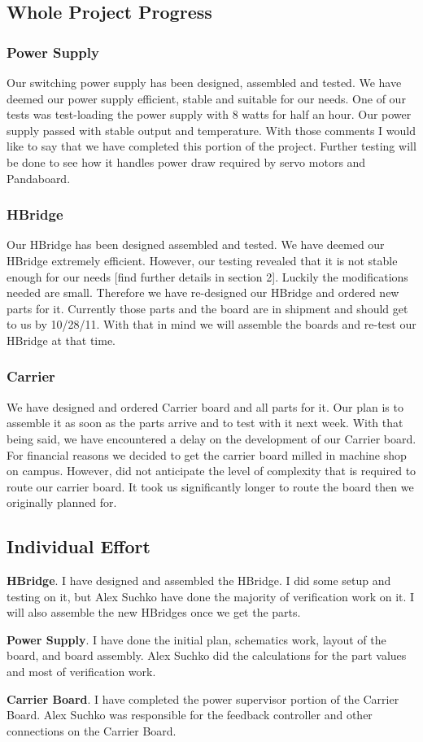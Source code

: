 \documentclass[12pt]{article}
\begin{document}
\subsection{Whole Project Progress}
\subsubsection{Power Supply}
Our switching power supply has been designed, assembled and tested. We have deemed our power supply efficient, stable and suitable for our needs. One of our tests was test-loading the power supply with 8 watts for half an hour. Our power supply passed with stable output and temperature. With those comments I would like to say that we have completed this portion of the project. Further testing will be done to see how it handles power draw required by servo motors and Pandaboard.
\subsubsection{HBridge}
Our HBridge has been designed assembled and tested. We have deemed our HBridge extremely efficient. However, our testing revealed that it is not stable enough for our needs [find further details in section 2]. Luckily the modifications needed are small. Therefore we have re-designed our HBridge and ordered new parts for it. Currently those parts and the board are in shipment and should get to us by 10/28/11. With that in mind we will assemble the boards and re-test our HBridge at that time. 
\subsubsection{Carrier}
We have designed and ordered Carrier board and all parts for it. Our plan is to assemble it as soon as the parts arrive and to test with it next week. With that being said, we have encountered a delay on the development of our Carrier board. For financial reasons we decided to get the carrier board milled in machine shop on campus. However, did not anticipate the level of complexity that is required to route our carrier board. It took us significantly longer to route the board then we originally planned for.
\subsection{Individual Effort}
 \begin{description}
  \item{\bf HBridge}. I have designed and assembled the HBridge. I did some setup and testing on it, but Alex Suchko have done the majority of verification work on it. I will also assemble the new HBridges once we get the parts. 
  \item{\bf Power Supply}. I  have done the initial plan, schematics work, layout of the board, and board assembly. Alex Suchko did the calculations for the part values and most of verification work. 
  \item{\bf Carrier Board}. I have completed the power supervisor portion of the Carrier Board. Alex Suchko was responsible for the feedback controller and other connections on the Carrier Board.
\end{description}
\end{document}
